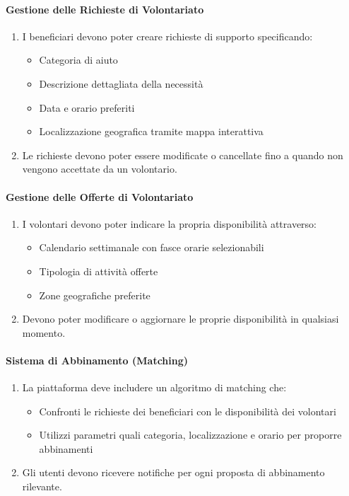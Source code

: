 \paragraph{Gestione delle Richieste di Volontariato}

\begin{enumerate}
    \item I beneficiari devono poter creare richieste di supporto specificando:
    \begin{itemize}
        \item Categoria di aiuto
        \item Descrizione dettagliata della necessità
        \item Data e orario preferiti
        \item Localizzazione geografica tramite mappa interattiva
    \end{itemize}
    
    \item Le richieste devono poter essere modificate o cancellate fino a quando non vengono accettate da un volontario.
\end{enumerate}

\paragraph{Gestione delle Offerte di Volontariato}

\begin{enumerate}
    \item I volontari devono poter indicare la propria disponibilità attraverso:
    \begin{itemize}
        \item Calendario settimanale con fasce orarie selezionabili
        \item Tipologia di attività offerte
        \item Zone geografiche preferite
    \end{itemize}
    
    \item Devono poter modificare o aggiornare le proprie disponibilità in qualsiasi momento.
\end{enumerate}

\paragraph{Sistema di Abbinamento (Matching)}

\begin{enumerate}
    \item La piattaforma deve includere un algoritmo di matching che:
    \begin{itemize}
        \item Confronti le richieste dei beneficiari con le disponibilità dei volontari
        \item Utilizzi parametri quali categoria, localizzazione e orario per proporre abbinamenti
    \end{itemize}
    
    \item Gli utenti devono ricevere notifiche per ogni proposta di abbinamento rilevante.
\end{enumerate}


